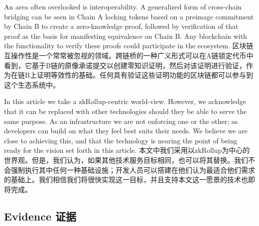 \documentclass{ctexart}
\begin{document}
An area often overlooked is interoperability. A generalized form of cross-chain bridging can be seen in Chain A locking tokens based on a preimage commitment by Chain B to create a zero-knowledge proof, followed by verification of that proof as the basis for manifesting equivalence on Chain B. Any blockchain with the functionality to verify these proofs could participate in the ecosystem. 区块链互操作性是一个常常被忽视的领域。跨链桥的一种广义形式可以在A链锁定代币中看到，它基于B链的原像承诺提交以创建零知识证明，然后对该证明进行验证，作为在链B上证明等效性的基础。任何具有验证这些证明功能的区块链都可以参与到这个生态系统中。

In this article we take a zkRollup-centric world-view. However, we acknowledge that it can be replaced with other technologies should they be able to serve the same purpose. As an infrastructure we are not enforcing one or the other; as developers can build on what they feel best suits their needs. We believe we are close to achieving this, and that the technology is nearing the point of being ready for the vision set forth in this article. 本文中我们采用以zkRollup为中心的世界观。但是，我们认为，如果其他技术服务目标相同，也可以将其替换。我们不会强制执行其中任何一种基础设施；开发人员可以搭建在他们认为最适合他们需求的基础上。我们相信我们将很快实现这一目标，并且支持本文这一愿景的技术也即将完成。

\subsection{Evidence 证据}
\end{document}
